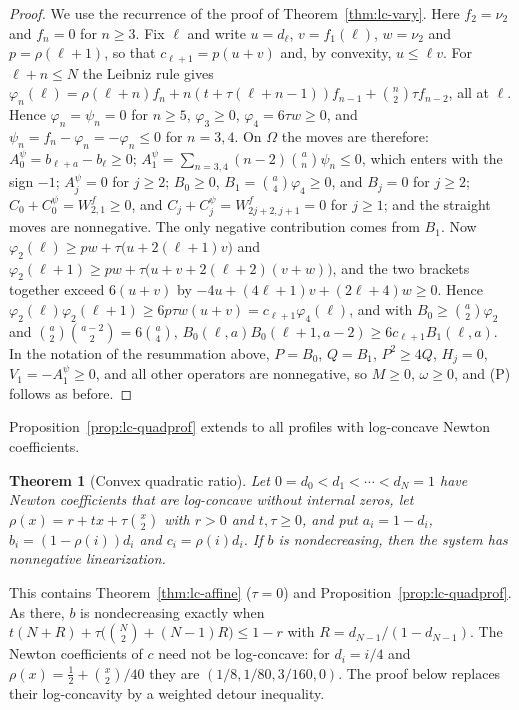 \documentclass[twoside,10pt]{article}
\numberwithin{equation}{section}
\theoremstyle{slbody}
\newtheorem{theorem}{Theorem}[section]
\theoremstyle{definition}
\theoremstyle{remark}
\begin{document}
\begin{proof}
We use the recurrence of the proof of Theorem~\ref{thm:lc-vary}. Here $f_2=\nu_2$ and $f_n=0$ for $n\geq3$. Fix $\ell$ and write $u=d_\ell$, $v=f_1(\ell)$, $w=\nu_2$ and $p=\rho(\ell+1)$, so that $c_{\ell+1}=p(u+v)$ and, by convexity, $u\leq\ell v$. For $\ell+n\leq N$ the Leibniz rule gives $\varphi_n(\ell)=\rho(\ell+n)f_n+n(t+\tau(\ell+n-1))f_{n-1}+\binom n2\tau f_{n-2}$, all at $\ell$. Hence $\varphi_n=\psi_n=0$ for $n\geq5$, $\varphi_3\geq0$, $\varphi_4=6\tau w\geq0$, and $\psi_n=f_n-\varphi_n=-\varphi_n\leq0$ for $n=3,4$. On $\Omega$ the moves are therefore: $A^\psi_0=b_{\ell+a}-b_\ell\geq0$; $A^\psi_1=\sum_{n=3,4}(n-2)\binom an\psi_n\leq0$, which enters with the sign $-1$; $A^\psi_j=0$ for $j\geq2$; $B_0\geq0$, $B_1=\binom a4\varphi_4\geq0$, and $B_j=0$ for $j\geq2$; $C_0+C^\psi_0=W^f_{2,1}\geq0$, and $C_j+C^\psi_j=W^f_{2j+2,j+1}=0$ for $j\geq1$; and the straight moves are nonnegative. The only negative contribution comes from $B_1$. Now $\varphi_2(\ell)\geq pw+\tau\bigl(u+2(\ell+1)v\bigr)$ and $\varphi_2(\ell+1)\geq pw+\tau\bigl(u+v+2(\ell+2)(v+w)\bigr)$, and the two brackets together exceed $6(u+v)$ by $-4u+(4\ell+1)v+(2\ell+4)w\geq0$. Hence $\varphi_2(\ell)\varphi_2(\ell+1)\geq6p\tau w(u+v)=c_{\ell+1}\varphi_4(\ell)$, and with $B_0\geq\binom a2\varphi_2$ and $\binom a2\binom{a-2}2=6\binom a4$, $B_0(\ell,a)B_0(\ell+1,a-2)\geq6c_{\ell+1}B_1(\ell,a)$. In the notation of the resummation above, $P=B_0$, $Q=B_1$, $P^2\geq4Q$, $H_j=0$, $V_1=-A^\psi_1\geq0$, and all other operators are nonnegative, so $M\geq0$, $\omega\geq0$, and (P) follows as before.
\end{proof}

Proposition~\ref{prop:lc-quadprof} extends to all profiles with log-concave Newton coefficients.

\begin{theorem}[Convex quadratic ratio]\label{thm:lc-quadratic}
Let $0=d_0<d_1<\cdots<d_N=1$ have Newton coefficients that are log-concave without internal zeros, let $\rho(x)=r+tx+\tau\binom x2$ with $r>0$ and $t,\tau\geq0$, and put $a_i=1-d_i$, $b_i=(1-\rho(i))d_i$ and $c_i=\rho(i)d_i$. If $b$ is nondecreasing, then the system has nonnegative linearization.
\end{theorem}

This contains Theorem~\ref{thm:lc-affine} ($\tau=0$) and Proposition~\ref{prop:lc-quadprof}. As there, $b$ is nondecreasing exactly when $t(N+R)+\tau\bigl(\binom N2+(N-1)R\bigr)\leq1-r$ with $R=d_{N-1}/(1-d_{N-1})$. The Newton coefficients of $c$ need not be log-concave: for $d_i=i/4$ and $\rho(x)=\frac12+\binom x2/40$ they are $(1/8,1/80,3/160,0)$. The proof below replaces their log-concavity by a weighted detour inequality.
\end{document}
